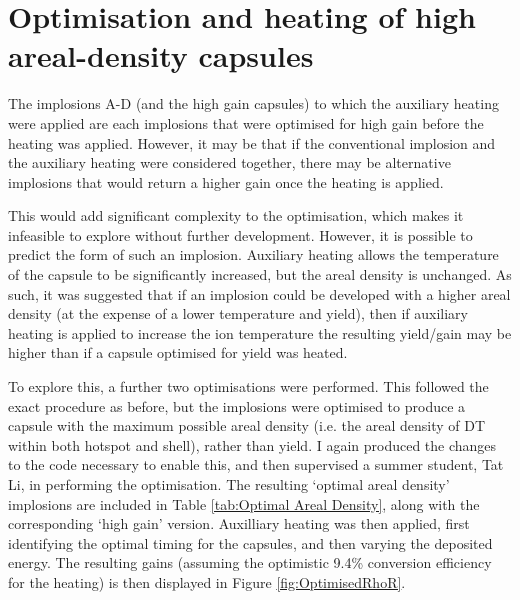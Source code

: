 \section{Optimisation and heating of high areal-density capsules}
The implosions A-D (and the high gain capsules) to which the auxiliary heating were applied are each implosions that were optimised for high gain before the heating was applied. However, it may be that if the conventional implosion and the auxiliary heating were considered together, there may be alternative implosions that would return a higher gain once the heating is applied.

This would add significant complexity to the optimisation, which makes it infeasible to explore without further development. However, it is possible to predict the form of such an implosion. Auxiliary heating allows the temperature of the capsule to be significantly increased, but the areal density is unchanged. As such, it was suggested that if an implosion could be developed with a higher areal density (at the expense of a lower temperature and yield), then if auxiliary heating is applied to increase the ion temperature the resulting yield/gain may be higher than if a capsule optimised for yield was heated.

To explore this, a further two optimisations were performed. This followed the exact procedure as before, but the implosions were optimised to produce a capsule with the maximum possible areal density (i.e. the areal density of DT within both hotspot and shell), rather than yield. I again produced the changes to the code necessary to enable this, and then supervised a summer student, Tat Li, in performing the optimisation. The resulting `optimal areal density' implosions are included in Table \ref{tab:Optimal Areal Density}, along with the corresponding `high gain' version. Auxilliary heating was then applied, first identifying the optimal timing for the capsules, and then varying the deposited energy. The resulting gains (assuming the optimistic 9.4\% conversion efficiency for the heating) is then displayed in Figure \ref{fig:OptimisedRhoR}.


